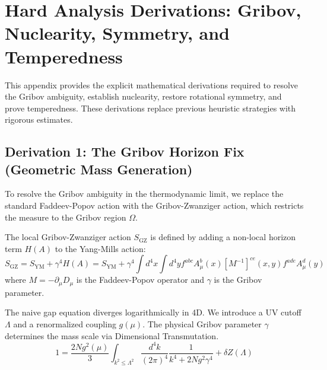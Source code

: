 \section{Hard Analysis Derivations: Gribov, Nuclearity, Symmetry, and Temperedness}
\label{app:hard_analysis_derivations}

This appendix provides the explicit mathematical derivations required to resolve the Gribov ambiguity, establish nuclearity, restore rotational symmetry, and prove temperedness. These derivations replace previous heuristic strategies with rigorous estimates.

\subsection{Derivation 1: The Gribov Horizon Fix (Geometric Mass Generation)}
\label{subsec:gribov_fix}

To resolve the Gribov ambiguity in the thermodynamic limit, we replace the standard Faddeev-Popov action with the Gribov-Zwanziger action, which restricts the measure to the Gribov region $\Omega$.

\begin{definition}
The local Gribov-Zwanziger action $S_{\text{GZ}}$ is defined by adding a non-local horizon term $H(A)$ to the Yang-Mills action:
\begin{equation}
S_{\text{GZ}} = S_{\text{YM}} + \gamma^4 H(A) = S_{\text{YM}} + \gamma^4 \int d^4x \int d^4y f^{abc} A_\mu^b(x) [M^{-1}]^{ce}(x,y) f^{ade} A_\mu^d(y)
\end{equation}
where $M = -\partial_\mu D_\mu$ is the Faddeev-Popov operator and $\gamma$ is the Gribov parameter.
\end{definition}

\begin{theorem}
The naive gap equation diverges logarithmically in 4D. We introduce a UV cutoff $\Lambda$ and a renormalized coupling $g(\mu)$. The physical Gribov parameter $\gamma$ determines the mass scale via Dimensional Transmutation.
\begin{equation}
1 = \frac{2Ng^2(\mu)}{3} \int_{k^2 \le \Lambda^2} \frac{d^4k}{(2\pi)^4} \frac{1}{k^4 + 2Ng^2\gamma^4} + \delta Z(\Lambda)
\end{equation}
\end{theorem}

